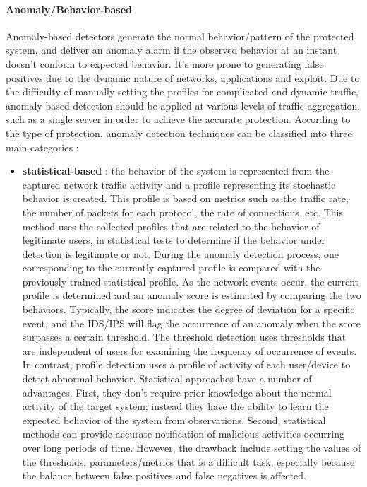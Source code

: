 \documentclass[11pt]{article}
\begin{document}
\paragraph{Anomaly/Behavior-based} Anomaly-based detectors generate the normal behavior/pattern of the protected system, and deliver an anomaly alarm if the observed behavior at an instant doesn't conform to expected behavior. It's more prone to generating false positives due to the dynamic nature of networks, applications and exploit. Due to the difficulty of manually setting the profiles for complicated and dynamic traffic, anomaly-based detection should be applied at various levels of traffic aggregation, such as a single server in order to achieve the accurate protection. According to the type of protection, anomaly detection techniques can be classified into three main categories :
\begin{itemize}
\item \textbf{statistical-based} : the behavior of the system is represented from the captured network traffic activity and a profile representing its stochastic behavior is created. This profile is based on metrics such as the traffic rate, the number of packets for each protocol, the rate of connections, etc. This method uses the collected profiles that are related to the behavior of legitimate users, in statistical tests to determine if the behavior under detection is legitimate or not. During the anomaly detection process, one corresponding to the currently captured profile is compared with the previously trained statistical profile. As the network events occur, the current profile is determined and an anomaly score is estimated by comparing the two behaviors. Typically, the score indicates the degree of deviation for a specific event, and the IDS/IPS will flag the occurrence of an anomaly when the score surpasses a certain threshold. The threshold detection uses thresholds that are independent of users for examining the frequency of occurrence of events. In contrast, profile detection uses a profile of activity of each user/device to detect abnormal behavior. Statistical approaches have a number of advantages. First, they don't require prior knowledge about the normal activity of the target system; instead they have the ability to learn the expected behavior of the system from observations. Second, statistical methods can provide accurate notification of malicious activities occurring over long periods of time. However, the drawback include setting the values of the thresholds, parameters/metrics that is a difficult task, especially because the balance between false positives and false negatives is affected.

\end{itemize}
\end{document}
